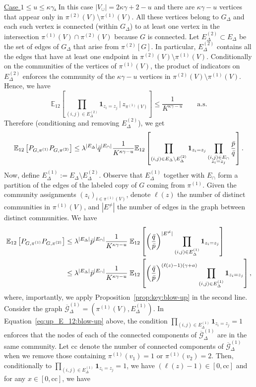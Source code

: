 \documentclass[final]{colt2026}
\newcommand{\1}{\mathbf{1}}
\newcommand{\bbE}{\mathbb{E}}
\newcommand{\cro}[1]{\left[#1\right]}
\begin{document}
\noindent\underline{Case $1\le u\le \kappa \gamma$.} In this case $|V_{\cup}|=2\kappa \gamma+2-u$ and there are $\kappa \gamma -u$ vertices that appear only in $\pi^{(2)}(V)\setminus\pi^{(1)}(V)$. All these vertices belong to $G_{\Delta}$ and each such vertex is connected (within $G_\Delta$) to at least one vertex in the intersection $\pi^{(1)}(V)\cap\pi^{(2)}(V)$ because  $G$ is connected. Let $E_{\Delta}^{(2)}\subset E_{\Delta}$ be the set of edges of $G_{\Delta}$ that arise from $\pi^{(2)}[G]$. In particular, $E_{\Delta}^{(2)}$ contains all the edges that have at least one endpoint in $\pi^{(2)}(V)\setminus\pi^{(1)}(V)$. Conditionally on the communities  of the vertices of $\pi^{(1)}(V)$, the product of indicators on $E_{\Delta}^{(2)}$ enforces the community of the  $\kappa \gamma-u$ vertices in $\pi^{(2)}(V)\setminus\pi^{(1)}(V)$. Hence,  we have 
\[
\bbE_{12}\left[\prod_{(i,j)\in E^{(2)}_{\Delta}} \mathbf 1_{z_{i}=z_{j}} \,\Bigg|\, z_{\pi^{(1)}(V)}\right] \le \frac{1}{K^{\kappa \gamma-u}}\qquad\text{a.s.}
\]
Therefore (conditioning and removing $E^{(2)}_\Delta$), we get 
\[
\bbE_{12}\cro{P_{G,\pi^{(1)}}P_{G,\pi^{(2)}}}
\le \lambda^{|E_{\Delta}|} \bar q^{|E_{\cap}|}\frac{1}{K^{\kappa \gamma-u}}
 \bbE_{12}\cro{\prod_{(i,j)\in E_{\Delta}\setminus  E^{(2)}_{\Delta} }\mathbf 1_{z_{i}=z_{j}}\prod_{\substack{(i,j)\in E_{\cap}\\ z_{i}=z_{j}}}{\bar p\over \bar q}}.
\]
Now, define $E^{(1)}_{\Delta}:= E_{\Delta}\setminus E^{(2)}_{\Delta}$. Observe that  $E^{(1)}_{\Delta}$ together with $E_{\cap}$ form a partition of the edges of the labeled copy of $G$ coming from $\pi^{(1)}$. Given the community assignments $(z_i)_{i\in \pi^{(1)}(V)}$, denote $\ell(z)$ the number of distinct communities in $\pi^{(1)}(V)$, and $|E^{\neq}|$ the number of edges in the graph between distinct communities. We have
\begin{align}
\bbE_{12}\cro{P_{G,\pi^{(1)}}P_{G,\pi^{(2)}}} \nonumber 
&\le \lambda^{|E_{\Delta}|}\bar p^{|E_{\cap}|}\frac{1}{K^{\kappa \gamma-u}}
\;\bbE_{12}\cro{\left({\bar q \over \bar p}\right)^{|E^{\neq}|} \prod_{(i,j)\in E^{(1)}_{\Delta}}\mathbf 1_{z_{i}=z_{j}}}\\ 
&\le \lambda^{|E_{\Delta}|}\bar p^{|E_{\cap}|}\frac{1}{K^{\kappa \gamma-u}}
\;\bbE_{12}\cro{\left({\bar q \over \bar p}\right)^{(\ell(z)-1)(\gamma + a)} \prod_{(i,j)\in E^{(1)}_{\Delta}}\mathbf 1_{z_{i}=z_{j}}} ,\label{eq:up_E_12:blow-up}
\end{align}
where, importantly, we apply Proposition~\ref{prop:key:blow-up} in the second line. Consider the  graph $\overline{\mathcal{G}}^{(1)}_{\Delta}=(\pi^{(1)}(V),E^{(1)}_{\Delta})$.  In Equation~\eqref{eq:up_E_12:blow-up} above, the condition $\prod_{(i,j)\in E^{(1)}_{\Delta}}\mathbf 1_{z_{i}=z_{j}}=1$ enforces that the nodes of each of the connected components of $\overline{\mathcal{G}}^{(1)}_{\Delta}$ are in the same community. Let $\mathrm{cc}$ denote the number of connected components of $\overline{\mathcal{G}}^{(1)}_{\Delta}$ when we remove those containing $\pi^{(1)}(v_1)=1$ or  $\pi^{(1)}(v_2)=2$. Then, conditionally to $\prod_{(i,j)\in E^{(1)}_{\Delta}}\mathbf 1_{z_{i}=z_{j}}=1$, we have $(\ell(z)-1)\in [0,\mathrm{cc}]$ and for any $x\in [0,\mathrm{cc}]$, we have 
\end{document}
